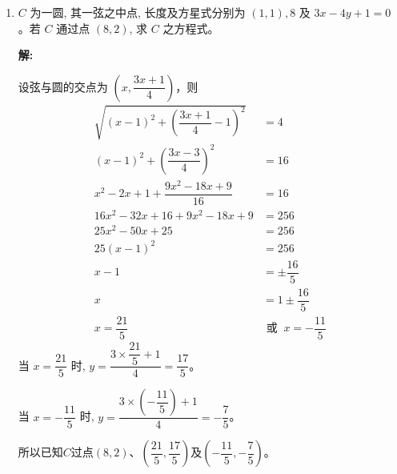 \documentclass[10pt]{article}
\newcommand{\sol}{\textbf{解:} }
\begin{document}
\begin{enumerate}[leftmargin=*]
  \item $C$ 为一圆, 其一弦之中点, 长度及方星式分别为 $(1,1), 8$ 及 $3 x-4 y+1=0$ 。若 $C$ 通过点 $(8,2)$, 求 $C$ 之方程式。

        \sol{}

        设弦与圆的交点为 $\left(x, \dfrac{3x+1}{4}\right)$，则
        \begin{align*}
          \sqrt{(x-1)^{2} + \left(\dfrac{3x+1}{4}-1\right)^{2}} & = 4                            \\
          (x-1)^{2} + \left(\dfrac{3x-3}{4}\right)^{2}          & = 16                           \\
          x^{2} - 2x + 1 + \dfrac{9x^{2}-18x+9}{16}             & = 16                           \\
          16x^{2} - 32x + 16 + 9x^{2} - 18x + 9                 & = 256                          \\
          25x^{2} - 50x + 25                                    & = 256                          \\
          25(x-1)^{2}                                           & = 256                          \\
          x-1                                                   & = \pm \dfrac{16}{5}            \\
          x                                                     & = 1 \pm \dfrac{16}{5}          \\
          x = \dfrac{21}{5}                                     & \text{ 或 }\ x = -\dfrac{11}{5}
        \end{align*}
        当 $x = \dfrac{21}{5}$ 时, $y = \dfrac{3 \times \dfrac{21}{5} + 1}{4} = \dfrac{17}{5}$。

        当 $x = -\dfrac{11}{5}$ 时, $y = \dfrac{3 \times \left(-\dfrac{11}{5}\right) + 1}{4} = -\dfrac{7}{5}$。

        所以已知$C$过点$(8, 2)$、$\left(\dfrac{21}{5}, \dfrac{17}{5}\right)$及$\left(-\dfrac{11}{5}, -\dfrac{7}{5}\right)$。


\end{enumerate}
\end{document}
